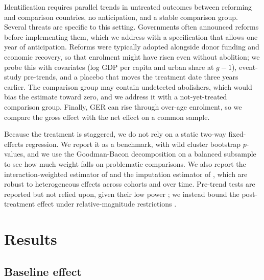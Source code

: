 \documentclass[12pt]{article}
\begin{document}
Identification requires parallel trends in untreated outcomes between reforming and comparison countries, no anticipation, and a stable comparison group. Several threats are specific to this setting. Governments often announced reforms before implementing them, which we address with a specification that allows one year of anticipation. Reforms were typically adopted alongside donor funding and economic recovery, so that enrolment might have risen even without abolition; we probe this with covariates (log GDP per capita and urban share at $g-1$), event-study pre-trends, and a placebo that moves the treatment date three years earlier. The comparison group may contain undetected abolishers, which would bias the estimate toward zero, and we address it with a not-yet-treated comparison group. Finally, GER can rise through over-age enrolment, so we compare the gross effect with the net effect on a common sample.

Because the treatment is staggered, we do not rely on a static two-way fixed-effects regression. We report it as a benchmark, with wild cluster bootstrap $p$-values, and we use the Goodman-Bacon decomposition \citep{goodmanbacon2021difference} on a balanced subsample to see how much weight falls on problematic comparisons. We also report the interaction-weighted estimator of \citet{sun2021estimating} and the imputation estimator of \citet{borusyak2024revisiting}, which are robust to heterogeneous effects across cohorts and over time. Pre-trend tests are reported but not relied upon, given their low power \citep{roth2022pretest}; we instead bound the post-treatment effect under relative-magnitude restrictions \citep{rambachan2023credible,roth2023trending}.

\section{Results}\label{sec:results}

\subsection{Baseline effect}
\end{document}
